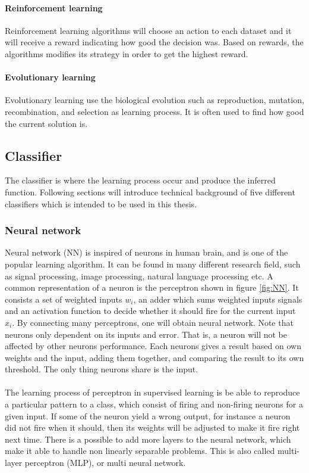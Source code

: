 \documentclass[USenglish]{ifimaster}  %
\begin{document}
	\paragraph{Reinforcement learning}
	Reinforcement learning algorithms will choose an action to each dataset and it will receive a reward indicating how good the decision was. Based on rewards, the algorithms modifies its strategy in order to get the highest reward. 
	
	\paragraph{Evolutionary learning}
	Evolutionary learning use the biological evolution such as reproduction, mutation, recombination, and selection as learning process. It is often used to find how good the current solution is.
	
	\subsection{Classifier} \label{sub:classifier}
	The classifier is where the learning process occur and produce the inferred function. Following sections will introduce technical background of five different classifiers which is intended to be used in this thesis.
	
	\subsubsection{Neural network}
	Neural network (NN) is inspired of neurons in human brain, and is one of the popular learning algorithm. It can be found in many different research field, such as signal processing, image processing, natural language processing etc. A common representation of a neuron is the perceptron shown in figure \ref{fig:NN}. It consists a set of weighted inputs $w_i$, an adder which sums weighted inputs signals and an activation function to decide whether it should fire for the current input $x_i$. By connecting many perceptrons, one will obtain neural network. Note that neurons only dependent on its inputs and error. That is, a neuron will not be affected by other neurons performance. Each neurons gives a result based on own weights and the input, adding them together, and comparing the result to its own threshold. The only thing neurons share is the input. 
	\\
	\\
	The learning process of perceptron in supervised learning is be able to reproduce a particular pattern to a class, which consist of firing and non-firing neurons for a given input. If some of the neuron yield a wrong output, for instance a neuron did not fire when it should, then its weights will be adjusted to make it fire right next time. There is a possible to add more layers to the neural network, which make it able to handle non linearly separable problems. This is also called multi-layer perceptron (MLP), or multi neural network.
	
\end{document}
